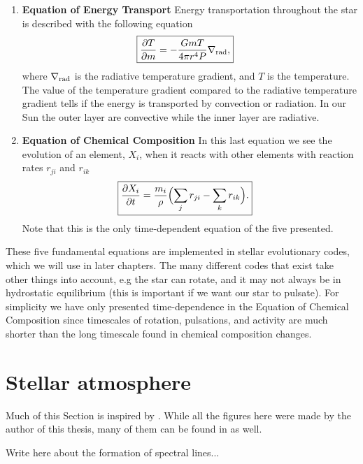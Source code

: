 \begin{enumerate}
    \item \textbf{Equation of Energy Transport}
        \nicebreak
        Energy transportation throughout the star is described with the
        following equation
        \begin{align}
            \Aboxed{\pd{T}{m} &= -\frac{GmT}{4\pi r^4P}\nabla_\tm{rad},}
        \end{align}
        where $\nabla_{\textnormal{rad}}$ is the radiative temperature gradient, and $T$
        is the temperature. The value of the temperature gradient compared to
        the radiative temperature gradient tells if the energy is transported by
        convection or radiation. In our Sun the outer layer are convective while
        the inner layer are radiative.

    \item \textbf{Equation of Chemical Composition}
        \nicebreak
        In this last equation we see the evolution of an element, $X_i$, when
        it reacts with other elements with reaction rates $r_{ji}$ and $r_{ik}$
        \begin{align}
            \Aboxed{\pd{X_i}{t} &= \frac{m_i}{\rho} \Bigl( \sum_j r_{ji} - \sum_k r_{ik}\Bigr).}
        \end{align}
        Note that this is the only time-dependent equation of the five
        presented.
\end{enumerate}

These five fundamental equations are implemented in stellar evolutionary codes,
which we will use in later chapters. The many different codes that exist take
other things into account, e.g the star can rotate, and it may not always be in
hydrostatic equilibrium (this is important if we want our star to pulsate). For
simplicity we have only presented time-dependence in the Equation of Chemical
Composition since timescales of rotation, pulsations, and activity are much
shorter than the long timescale found in chemical composition changes.


\section{Stellar atmosphere}

Much of this Section is inspired by \citet{Gray2006}. While all the figures here
were made by the author of this thesis, many of them can be found in
\citet{Gray2006} as well.

Write here about the formation of spectral lines...



